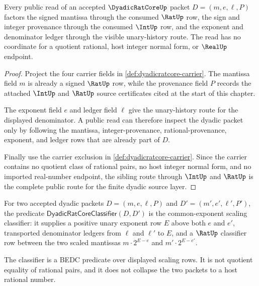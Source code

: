 \begin{theorem}
\label{thm:dyadic-rat-core-rat-int-sibling-route}
Every public read of an accepted $\DyadicRatCoreUp$ packet $D=(m,e,\ell,P)$ factors the signed mantissa through the consumed $\RatUp$ row, the sign and integer provenance through the consumed $\IntUp$ row, and the exponent and denominator ledger through the visible unary-history route. The read has no coordinate for a quotient rational, host integer normal form, or $\RealUp$ endpoint.
\end{theorem}
\begin{proof}
Project the four carrier fields in \autoref{def:dyadicratcore-carrier}. The mantissa field $m$ is already a signed $\RatUp$ row, while the provenance field $P$ records the attached $\IntUp$ and $\RatUp$ source certificates cited at the start of this chapter.

The exponent field $e$ and ledger field $\ell$ give the unary-history route for the displayed denominator. A public read can therefore inspect the dyadic packet only by following the mantissa, integer-provenance, rational-provenance, exponent, and ledger rows that are already part of $D$.

Finally use the carrier exclusion in \autoref{def:dyadicratcore-carrier}. Since the carrier contains no quotient class of rational pairs, no host integer normal form, and no imported real-number endpoint, the sibling route through $\IntUp$ and $\RatUp$ is the complete public route for the finite dyadic source layer.
\end{proof}

\begin{definition}
\label{def:dyadicratcore-classifier}
For two accepted dyadic packets
$D=(m,e,\ell,P)$ and $D'=(m',e',\ell',P')$, the predicate
$\mathsf{DyadicRatCoreClassifier}(D,D')$ is the common-exponent scaling
classifier: it supplies a positive unary exponent row $E$ above both $e$ and
$e'$, transported denominator ledgers from $\ell$ and $\ell'$ to $E$, and a
$\RatUp$ classifier row between the two scaled mantissas
$m\cdot 2^{E-e}$ and $m'\cdot 2^{E-e'}$.

The classifier is a BEDC predicate over displayed scaling rows. It is not
quotient equality of rational pairs, and it does not collapse the two packets
to a host rational number.
\end{definition}

